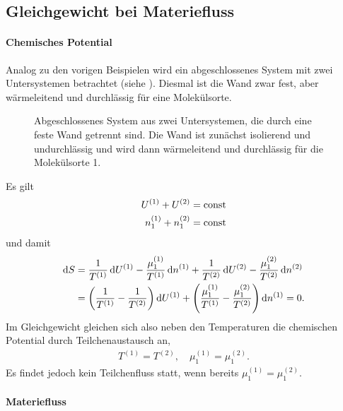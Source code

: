 \subsection{Gleichgewicht bei Materiefluss\label{sec:gleichgewicht_bei_materiefluss}}

\paragraph*{Chemisches Potential}

Analog zu den vorigen Beispielen wird ein abgeschlossenes System mit zwei Untersystemen betrachtet (siehe ). Diesmal ist die Wand zwar fest, aber wärmeleitend und durchlässig für eine Molekülsorte.

\begin{figure}[htbp]
    \centering
    \tfigDoppelsystemUVNbeweglicheIsolierendeWand
    \caption{Abgeschlossenes System aus zwei Untersystemen, die durch eine feste Wand getrennt sind. Die Wand ist zunächst isolierend und undurchlässig und wird dann wärmeleitend und durchlässig für die Molekülsorte 1.}
    \label{fig:DoppelsystemUVNbeweglicheIsolierendeWand}
\end{figure}

Es gilt
\begin{align*}
    U^{(1)} + U^{(2)}         & = \mathrm{const} \\
    n_1^{(1)} + n_1^{(2)} & = \mathrm{const}
\end{align*}
und damit
\begin{align*}
    \mathop{}\!\mathrm{d} S & = \frac{1}{T^{(1)}}\mathop{}\!\mathrm{d} U^{(1)} - \frac{\mu_1^{(1)}}{T^{(1)}}\mathop{}\!\mathrm{d} n^{(1)}+\frac{1}{T^{(2)}}\mathop{}\!\mathrm{d} U^{(2)} - \frac{\mu_1^{(2)}}{T^{(2)}}\mathop{}\!\mathrm{d} n^{(2)}   \\
            & = \left(\frac{1}{T^{(1)}}-\frac{1}{T^{(2)}}\right)\mathop{}\!\mathrm{d} U^{(1)} + \left(\frac{\mu_1^{(1)}}{T^{(1)}}-\frac{\mu_1^{(2)}}{T^{(2)}}\right) \mathop{}\!\mathrm{d} n^{(1)} = 0.
\end{align*}
Im Gleichgewicht gleichen sich also neben den Temperaturen die chemischen Potential durch Teilchenaustausch an,
\begin{align*}
    T^{(1)} = T^{(2)}, \quad \mu_1^{(1)} = \mu_1^{(2)}.
\end{align*}
Es findet jedoch kein Teilchenfluss statt, wenn bereits $\mu_1^{(1)} = \mu_1^{(2)}$.

\paragraph*{Materiefluss}

